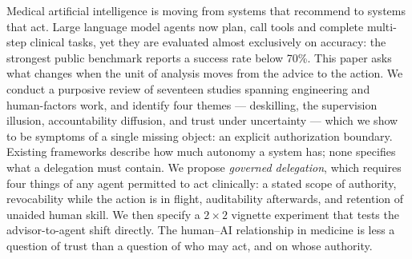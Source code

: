 
Medical artificial intelligence is moving from systems that recommend to systems that act. Large language model agents now plan, call tools and complete multi-step clinical tasks, yet they are evaluated almost exclusively on accuracy: the strongest public benchmark reports a success rate below 70\%. This paper asks what changes when the unit of analysis moves from the advice to the action. We conduct a purposive review of seventeen studies spanning engineering and human-factors work, and identify four themes --- deskilling, the supervision illusion, accountability diffusion, and trust under uncertainty --- which we show to be symptoms of a single missing object: an explicit authorization boundary. Existing frameworks describe how much autonomy a system has; none specifies what a delegation must contain. We propose \emph{governed delegation}, which requires four things of any agent permitted to act clinically: a stated scope of authority, revocability while the action is in flight, auditability afterwards, and retention of unaided human skill. We then specify a $2\times2$ vignette experiment that tests the advisor-to-agent shift directly. The human--AI relationship in medicine is less a question of trust than a question of who may act, and on whose authority.
